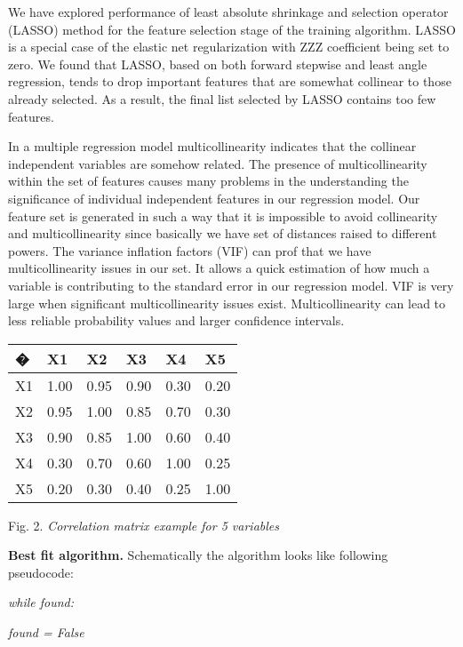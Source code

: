 \documentclass[aps,prl,reprint,amsmath,amssymb,nature]{revtex4-1}
\begin{document}
We have explored performance of least absolute 
shrinkage and selection operator (LASSO) method for the feature 
selection stage of the training algorithm. LASSO is a special case of 
the elastic net regularization with ZZZ coefficient being set to zero. 
We found that LASSO, based on both forward stepwise and least angle 
regression, tends to drop important features that are somewhat collinear 
to those already selected. As a result, the final list selected by LASSO 
contains too few features.

In a multiple regression model multicollinearity indicates that the 
collinear independent variables are somehow related. The presence of 
multicollinearity within the set of features causes many problems in the 
understanding the significance of individual independent features in our 
regression model. Our feature set is generated in such a way that it is 
impossible to avoid collinearity and multicollinearity since basically 
we have set of distances raised to different powers. The variance 
inflation factors (VIF) can prof that we have multicollinearity issues 
in our set. It allows a quick estimation of how much a variable is 
contributing to the standard error in our regression model. VIF is very 
large when significant multicollinearity issues exist. Multicollinearity 
can lead to less reliable probability values and larger confidence 
intervals.

\begin{table}[h]
\centering
\begin{tabular}{|l|l|l|l|l|l|}
\hline
� & X1 & X2 & X3 & X4 & X5 \\
\hline
X1 & 1.00 & 0.95 & 0.90 & 0.30 & 0.20 \\
\hline
X2 & 0.95 & 1.00 & 0.85 & 0.70 & 0.30 \\
\hline
X3 & 0.90 & 0.85 & 1.00 & 0.60 & 0.40 \\
\hline
X4 & 0.30 & 0.70 & 0.60 & 1.00 & 0.25 \\
\hline
X5 & 0.20 & 0.30 & 0.40 & 0.25 & 1.00 \\
\hline
\end{tabular}
\end{table}


Fig. 2. \textit{Correlation matrix example for 5 variables}

\textbf{Best fit algorithm.} Schematically the algorithm looks like 
following pseudocode:

\textit{while found:}

\textit{found = False}
\end{document}
